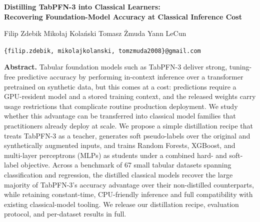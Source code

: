 \documentclass[10pt]{article}
\begin{document}
\begin{center}
  {\Large\bfseries\color{inkgray} Distilling TabPFN-3 into Classical Learners: \\[2pt]
   Recovering Foundation-Model Accuracy at Classical Inference Cost\par}
  \vspace{1.1em}
  {\large
    Filip Zdebik \quad
    Mikołaj Kolański \quad
    Tomasz Żmuda \quad
    Yann LeCun \quad
  \par}
  \vspace{0.6em}
  {\small
    \texttt{\{filip.zdebik,\,mikolajkolanski,\,tomzmuda2008\}@gmail.com}
  \par}
\end{center}

\vspace{0.8em}

\begin{center}
\begin{minipage}{0.92\textwidth}
\small
\textbf{\color{accent}Abstract.}\quad
Tabular foundation models such as TabPFN-3 deliver strong, tuning-free
predictive accuracy by performing in-context inference over a
transformer pretrained on synthetic data, but this comes at a cost:
predictions require a GPU-resident model and a stored training
context, and the released weights carry usage restrictions that
complicate routine production deployment. We study whether this
advantage can be transferred into classical model families that
practitioners already deploy at scale. We propose a simple
distillation recipe that treats TabPFN-3 as a teacher, generates soft
pseudo-labels over the original and synthetically augmented inputs,
and trains Random Forests, XGBoost, and multi-layer perceptrons (MLPs)
as students under a combined hard- and soft-label objective. Across a
benchmark of 67 small tabular datasets spanning classification and
regression, the distilled classical models recover the large majority
of TabPFN-3's accuracy advantage over their non-distilled counterparts,
while retaining constant-time, CPU-friendly inference and full
compatibility with existing classical-model tooling. We release our
distillation recipe, evaluation protocol, and per-dataset results in
full.
\end{minipage}
\end{center}
\end{document}
